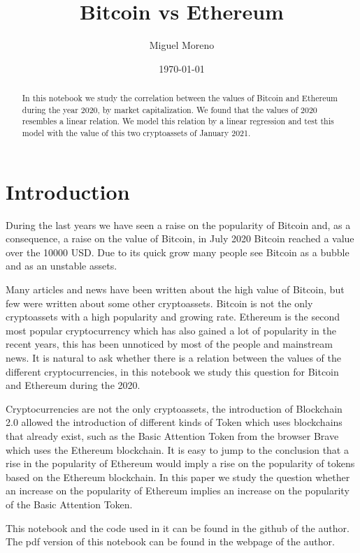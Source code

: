 \documentclass[14pt]{amsart}
\title{Bitcoin vs Ethereum}
\author{Miguel Moreno}
\begin{document}
\begin{abstract}
In this notebook we study the correlation between the values of Bitcoin and Ethereum during the year 2020, by market capitalization. We found that the values of 2020 resembles a linear
relation. We model this relation by a linear regression and test this model with the value of this
two cryptoassets of January 2021.
\end{abstract}

\date{\today}

\maketitle

\section{Introduction}\label{introduction}

During the last years we have seen a raise on the popularity of Bitcoin
and, as a consequence, a raise on the value of Bitcoin, in July 2020
Bitcoin reached a value over the 10000 USD. Due to its quick grow many
people see Bitcoin as a bubble and as an unstable assets.

Many articles and news have been written about the high value of
Bitcoin, but few were written about some other cryptoassets. Bitcoin is
not the only cryptoassets with a high popularity and growing rate.
Ethereum is the second most popular cryptocurrency which has also gained
a lot of popularity in the recent years, this has been unnoticed by most
of the people and mainstream news. It is natural to ask whether there is
a relation between the values of the different cryptocurrencies, in this
notebook we study this question for Bitcoin and Ethereum during the
2020.

Cryptocurrencies are not the only cryptoassets, the introduction of
Blockchain 2.0 allowed the introduction of different kinds of Token
which uses blockchains that already exist, such as the Basic Attention
Token from the browser Brave which uses the Ethereum blockchain. It is
easy to jump to the conclusion that a rise in the popularity of Ethereum
would imply a rise on the popularity of tokens based on the Ethereum
blockchain. In this paper we study the question whether an increase on
the popularity of Ethereum implies an increase on the popularity of the
Basic Attention Token.

This notebook and the code used in it can be found in the github of the
author. The pdf version of this notebook can be found in the webpage of
the author.
\end{document}
